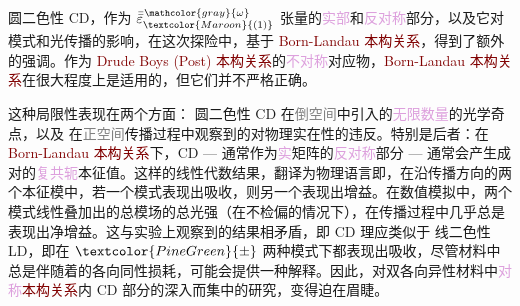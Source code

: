 \textcolor{NavyBlue}{圆二色性 CD}，作为 $\bar{\bar{\varepsilon}}^{\;\! \mathcolor{gray}{\omega}}_{\textcolor{Maroon}{(1)}}$ 张量的\textcolor{Plum}{实部}和\textcolor{Plum}{反对称}部分，以及它对\textcolor{PineGreen}{模式}和光传播的影响，在这次探险中，基于 \textcolor{Maroon}{Born-Landau} \textcolor{Maroon}{本构关系}，得到了额外的强调。作为 \textcolor{Maroon}{Drude Boys (Post)} \textcolor{Maroon}{本构关系}的\textcolor{Plum}{不对称}对应物，\textcolor{Maroon}{Born-Landau} \textcolor{Maroon}{本构关系}在很大程度上是适用的，但它们并不严格正确\cite{frantaConstitutiveEquationsDescribing2021,ossikovskiConstitutiveRelationsOptically2021}。

这种局限性表现在两个方面：{\one} \textcolor{NavyBlue}{圆二色性 CD} 在\textcolor{gray}{倒空间}中引入的\textcolor{Plum}{无限数量}的\textcolor{PineGreen}{光学奇点}，以及 {\two} 在\textcolor{gray}{正空间}传播过程中观察到的对\textcolor{NavyBlue}{物理实在性}的违反。特别是后者：在 \textcolor{Maroon}{Born-Landau} \textcolor{Maroon}{本构关系}下，\textcolor{NavyBlue}{CD} --- 通常作为\textcolor{Plum}{实}矩阵的\textcolor{Plum}{反对称}部分 --- 通常会产生成对的\textcolor{Plum}{复共轭}\textcolor{PineGreen}{本征值}。这样的线性代数结果，翻译为\textcolor{NavyBlue}{物理语言}即，在沿传播方向的两个\textcolor{PineGreen}{本征模}中，若一个\textcolor{PineGreen}{模式}表现出\textcolor{NavyBlue}{吸收}，则另一个表现出\textcolor{NavyBlue}{增益}。在数值模拟中，两个\textcolor{PineGreen}{模式}\textcolor{PineGreen}{线性叠加}出的\textcolor{PineGreen}{总模场}的\textcolor{NavyBlue}{总光强}（在不\textcolor{PineGreen}{检偏}的情况下），在传播过程中几乎总是表现出\textcolor{NavyBlue}{净增益}。这与实验上观察到的结果相矛盾，即 \textcolor{NavyBlue}{CD} 理应类似于 \textcolor{NavyBlue}{线二色性 LD}，即在 $\textcolor{PineGreen}{\pm}$ 两种模式\cite{multunasCircularDichroismCrystals2023}下都表现出\textcolor{NavyBlue}{吸收}，尽管材料中总是伴随着的各向同性\textcolor{NavyBlue}{损耗}，可能会提供一种解释。因此，对\textcolor{PineGreen}{双各向异性}材料中\textcolor{Plum}{对称}\textcolor{Maroon}{本构关系}内 \textcolor{NavyBlue}{CD} 部分的深入而集中的研究，变得迫在眉睫。

